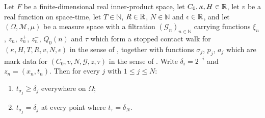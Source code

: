 \begin{helper}
Let $F$ be a finite-dimensional real inner-product space, let
$C_0,\kappa,H\in\mathbb{R}$, let $v$ be a real function on space-time, let
$T\in\mathbb N$, $R\in\mathbb{R}$, $N\in\mathbb N$ and $\epsilon\in\mathbb{R}$, and let
$(\Omega,\mathcal M,\mu)$ be a measure space with a filtration
$(\mathcal G_n)_{n\in\mathbb N}$ carrying functions $\xi_n$, $z_n$, $z^+_n$,
$z^-_n$, $Q_0(n)$ and $\tau$ which form a stopped contact walk for
$(\kappa,H,T,R,v,N,\epsilon)$ in the sense of , together
with functions $\sigma_j$, $p_j$, $a_j$ which are mark data for
$(C_0,v,N,\mathcal G,z,\tau)$ in the sense of . Write
$\delta_i=2^{-i}$ and $z_n=(x_n,t_n)$. Then for every $j$ with $1\le j\le N$:
\begin{enumerate}
\item[(i)] $t_{\sigma_j}\ge\delta_j$ everywhere on $\Omega$;
\item[(ii)] $t_{\sigma_j}=\delta_j$ at every point where $t_\tau=\delta_N$.
\end{enumerate}
\end{helper}

